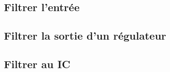 \begin{comment}
\begin{frame}{D'où provient le bruit}
    \begin{itemize}
        \item IC qui toggle
        \item Longues lignes de transmission
        \begin{itemize}
            \item Crosstalk
            \item Antennes
        \end{itemize}
        \item Mauvais chemins de retour
        \begin{itemize}
            \item Crosstalk
            \item Ground Bounce
            \item Antennes
        \end{itemize}
    \end{itemize}
\end{frame}

\end{comment}

\subsection{Filtrer l'entrée}


\subsection{Filtrer la sortie d'un régulateur}
\subsection{Filtrer au IC}